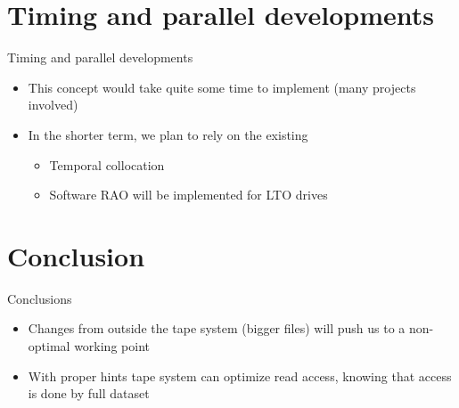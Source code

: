 \documentclass[aspectratio=149]{beamer}
\begin{document}
\section{Timing and parallel developments}
\begin{frame}{Timing and parallel developments}
\begin{itemize}
  \item This concept would take quite some time to implement (many projects involved)
  \item In the shorter term, we plan to rely on the existing
  \begin{itemize}
    \item Temporal collocation
    \item Software RAO will be implemented for LTO drives
  \end{itemize}
\end{itemize}
\end{frame}


\section{Conclusion}
\begin{frame}{Conclusions}
\begin{itemize}
  \item Changes from outside the tape system (bigger files) will push us to a non-optimal working point
  \item With proper hints tape system can optimize read access, knowing that access is done by full dataset
\end{itemize}
\end{frame}

\backcover
\end{document}
